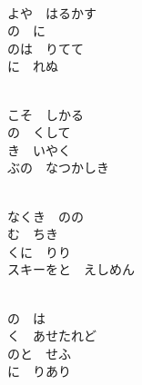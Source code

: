 \documentclass[10pt,b5j]{tarticle} %
\begin{document}
\vspace{1.5em} %
\newcommand{\linespace}{0.5em} %
\newcommand{\blocksize}{0.5\hsize} %
\newcommand{\itemmargin}{6em} %
\begin{enumerate} %
    \setlength{\itemindent}{\itemmargin} %
    \begin{minipage}[c]{\blocksize}
    
        \vspace{\linespace}
        \item~\\
        よや　はるかす\\
        の　に\\
        のは　りてて\\
        に　れぬ
        
        \vspace{\linespace}
        \item~\\
        こそ　しかる\\
        の　くして\\
        き　いやく\\
        ぶの　なつかしき
        
        \vspace{\linespace}
        \item~\\
        なくき　のの\\
        む　ちき\\
        くに　りり\\
        スキーをと　えしめん
        
        \vspace{\linespace}
        \item~\\
        の　は\\
        く　あせたれど\\
        のと　せふ\\
        に　りあり
        

\end{minipage}
\end{enumerate}
\end{document}

